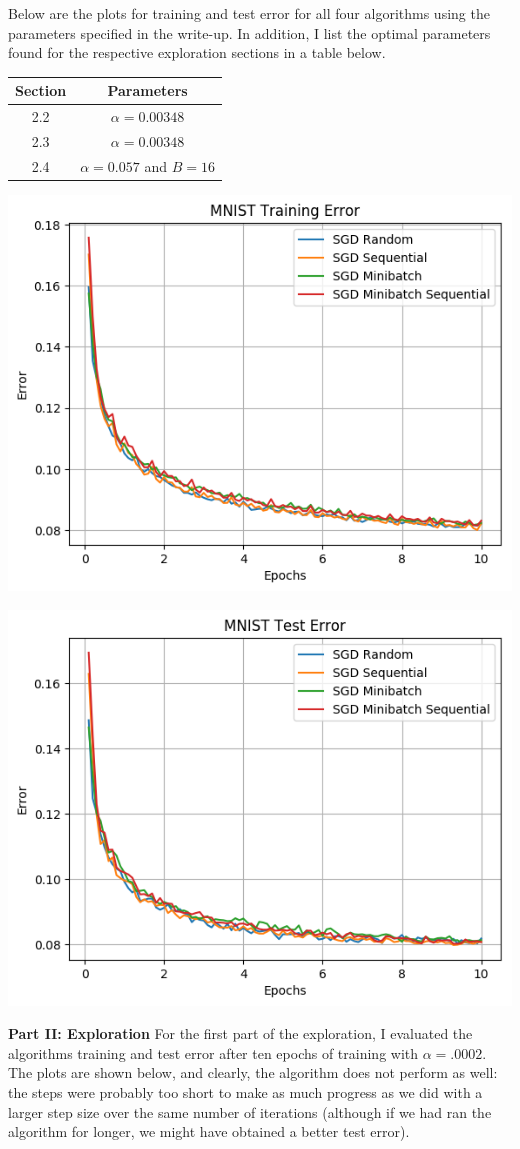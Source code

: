 \documentclass[10pt]{article}
\begin{document}
Below are the plots for training and test error for all four algorithms using the parameters specified in the write-up. In addition, I list the optimal parameters found for the respective exploration sections in a table below.
\begin{center}
\begin{tabular}{|c|c|} \hline
     Section & Parameters \\ \hline
     2.2 & $\alpha = 0.00348$ \\
     2.3 & $\alpha = 0.00348$ \\
     2.4 & $\alpha = 0.057$ and $B = 16$\\ \hline
\end{tabular}
\end{center}
\begin{center}
    \includegraphics[width=.45\textwidth]{training.png}
    \label{fig:tr_er}
\end{center}
\begin{center}
    \includegraphics[width=.45\textwidth]{test.png}
    \label{fig:te_er}
\end{center}


\textbf{Part II: Exploration}
For the first part of the exploration, I evaluated the algorithms training and test error after ten epochs of training with $\alpha = .0002$. The plots are shown below, and clearly, the algorithm does not perform as well: the steps were probably too short to make as much progress as we did with a larger step size over the same number of iterations (although if we had ran the algorithm for longer, we might have obtained a better test error).
\end{document}
